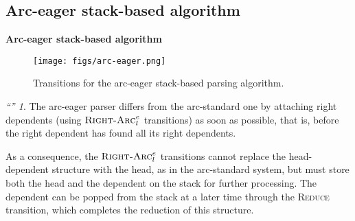 \documentclass[10pt]{beamer}%
\theoremstyle{remark}
\newtheorem*{myquote}{\large``\hfill ''}
\begin{document}
\subsection{Arc-eager stack-based algorithm}


\begin{frame}

  \textbf{Arc-eager stack-based algorithm}

  \begin{figure}[H]
    \centering
    \texttt{[image: figs/arc-eager.png]}
    \caption{Transitions for the arc-eager stack-based parsing algorithm.}
  \end{figure}

  \begin{myquote}
    The arc-eager parser differs from the arc-standard one by \alert{attaching right dependents (using $\textsc{Right-Arc}^e_l$ transitions) as soon as possible, that is, before the right dependent has found all its right dependents}.

    As a consequence, the $\textsc{Right-Arc}^e_l$ transitions cannot replace the head-dependent structure with the head, as in the arc-standard system, but must store both the head and the dependent on the stack for further processing. The dependent can be popped from the stack at a later time through the \textsc{Reduce} transition, which completes the reduction of this structure.
  \end{myquote}

\end{frame}
\end{document}
